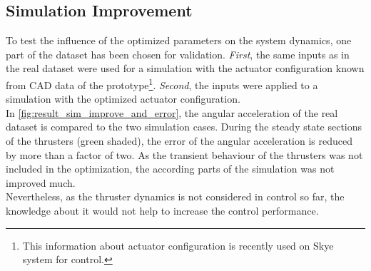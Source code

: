 \subsection{Simulation Improvement}
\label{sub:sim_improvement}
To test the influence of the optimized parameters on the system dynamics, one part of the dataset has been chosen for validation.
\textit{First}, the same inputs as in the real dataset were used for a simulation with the actuator configuration known from CAD data of the prototype\footnote{
This information about actuator configuration is recently used on Skye system for control.}.
\textit{Second}, the inputs were applied to a simulation with the optimized actuator configuration.\\
In \cref{fig:result_sim_improve_and_error}, the angular acceleration of the real dataset is compared to the two simulation cases.
During the steady state sections of the thrusters (green shaded), the error of the angular acceleration is reduced by more than a factor of two.
As the transient behaviour of the thrusters was not included in the optimization, the according parts of the simulation was not improved much.\\
Nevertheless, as the thruster dynamics is not considered in control so far, the knowledge about it would not help to increase the control performance.

